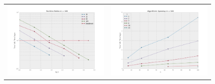\newcommand{\plotwidth}{2.5in} %
\begin{figure}
\begin{tabular}{cc}
\includegraphics[width=\plotwidth]{tratio100.png} & \includegraphics[width=\plotwidth]{tratioarc100.png} \\

\end{tabular}
\end{figure}
